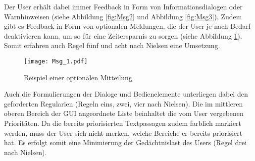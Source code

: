 Der User erh{\"a}lt dabei immer Feedback in Form von
Informationsdialogen oder Warnhinweisen (siehe Abbildung \ref{fig:Msg2} und
Abbildung
\ref{fig:Msg3}). Zudem gibt es Feedback in Form von optionalen Meldungen, die
der User je nach Bedarf deaktivieren kann, um so f{\"u}r eine Zeitersparnis zu
sorgen (siehe Abbildung \ref{fig:Msg1}). Somit erfahren auch Regel f{\"u}nf und
acht nach Nielsen eine Umsetzung.

\begin{figure}[H]
\centering
\texttt{[image: Msg\_1.pdf]}
\caption{Beispiel einer optionalen Mitteilung}
\label{fig:Msg1}
\end{figure}

Auch die Formulierungen der Dialoge und Bedienelemente unterliegen dabei den
geforderten Regularien (Regeln eins, zwei, vier nach Nielsen). Die im mittleren
oberen Bereich der \gls{GUI} angeordnete Liste beinhaltet die vom User vergebenen
Priorit{\"a}ten. Da die bereits priorisierten Textpassagen zudem farblich
markiert werden, muss der User sich nicht merken, welche Bereiche er bereits
priorisiert hat. Es erfolgt somit eine Minimierung der Ged{\"a}chtnislast des
Users (Regel drei nach Nielsen).
